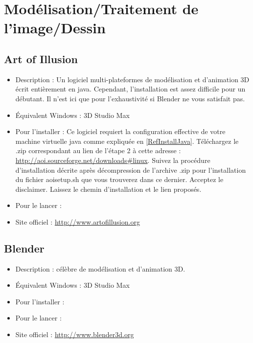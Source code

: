 \section{Modélisation/Traitement de l'image/Dessin}
\subsection{Art of Illusion}
\begin{itemize}
\begingroup
{}
\item Description : Un logiciel multi-plateformes de modélisation et d'animation 3D écrit entièrement en java. Cependant, l'installation est assez difficile pour un débutant. Il n'est ici que pour l'exhaustivité si Blender ne vous satisfait pas.{\par}
\item Équivalent Windows : 3D Studio Max{\par}
\endgroup
\item Pour l'installer : Ce logiciel requiert la configuration effective de votre machine virtuelle java comme expliquée en \ref{RefInstallJava}. Téléchargez le .zip correspondant au lien de l'étape 2 à cette adresse : \url{http://aoi.sourceforge.net/downloads#linux}. Suivez la procédure d'installation décrite après décompression de l'archive .zip pour l'installation du fichier aoisetup.sh que vous trouverez dans ce dernier. Acceptez le disclaimer. Laissez le chemin d'installation et le lien proposés.{\par}
\item Pour le lancer : 
\item Site officiel : \url{http://www.artofillusion.org}{\par}
\end{itemize}
\subsection{Blender}
\begin{itemize}
\begingroup
{}
\item Description :  célèbre de modélisation et d'animation 3D.{\par}
\item Équivalent Windows : 3D Studio Max{\par}
\item Pour l'installer : 
\item Pour le lancer : 
\item Site officiel : \url{http://www.blender3d.org}{\par}
\endgroup
\end{itemize}
